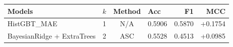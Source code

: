 \begin{tabular}{p{8cm}cclrr}
\toprule
Models & $k$ & Method & Acc & F1 & MCC \\
\midrule
HistGBT\_MAE & 1 & N/A & 0.5906 & 0.5870 & +0.1754 \\
BayesianRidge + ExtraTrees & 2 & ASC & 0.5528 & 0.4513 & +0.0985 \\
\bottomrule
\end{tabular}